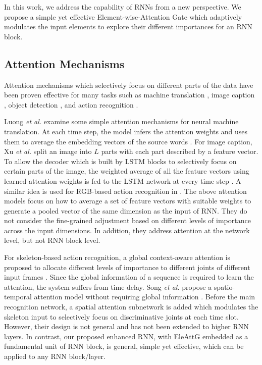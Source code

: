 \documentclass[runningheads]{llncs}
\newcommand{\Outer}{Element-wise}
\begin{document}
{	In this work, we address the capability of RNNs from a new perspective. We propose a simple yet effective \Outer-Attention Gate which adaptively modulates the input elements to explore their different importances for an RNN block. 

	\subsection{Attention Mechanisms}
	Attention mechanisms which selectively focus on different parts of the data have been proven effective for many tasks such as machine translation \cite{luong2015effective,vaswani2017attention}, image caption \cite{xu2015show}, object detection \cite{li2017attentive}, and action recognition \cite{sharma2015actionattention,wang2016hierarchical}. 


	Luong {\it et al.} examine some simple attention mechanisms for neural machine translation. At each time step, the model infers the attention weights and uses them to average the embedding vectors of the source words \cite{luong2015effective}. For image caption, Xu {\it et al.} split an image into $L$ parts with each part described by a feature vector. To allow the decoder which is built by LSTM blocks to selectively focus on certain parts of the image, the weighted average of all the feature vectors using learned attention weights is fed to the LSTM network at every time step \cite{xu2015show}. A similar idea is used for RGB-based action recognition in \cite{sharma2015actionattention}. The above attention models focus on how to  average a set of feature vectors with suitable weights to generate a pooled vector of the same dimension as the input of RNN. They do not consider the fine-grained adjustment based on different levels of importance across the input dimensions. In addition, they address attention at the network level, but not RNN block level.


	For skeleton-based action recognition, a global context-aware attention is proposed to allocate different levels of importance to different joints of different input frames \cite{liu2017global}. Since the global information of a sequence is required to learn the attention, the system suffers from time delay. Song {\it et al.} propose a spatio-temporal attention model without requiring global information \cite{song2017end}. Before the main recognition network, a spatial attention subnetwork is added which modulates the skeleton input to selectively focus on discriminative joints at each time slot. However, their design is not general and has not been extended to higher RNN layers. In contrast, our proposed enhanced RNN, with EleAttG embedded as a fundamental unit of RNN block, is general, simple yet effective, which can be applied to any RNN block/layer. 
	
}
\end{document}
